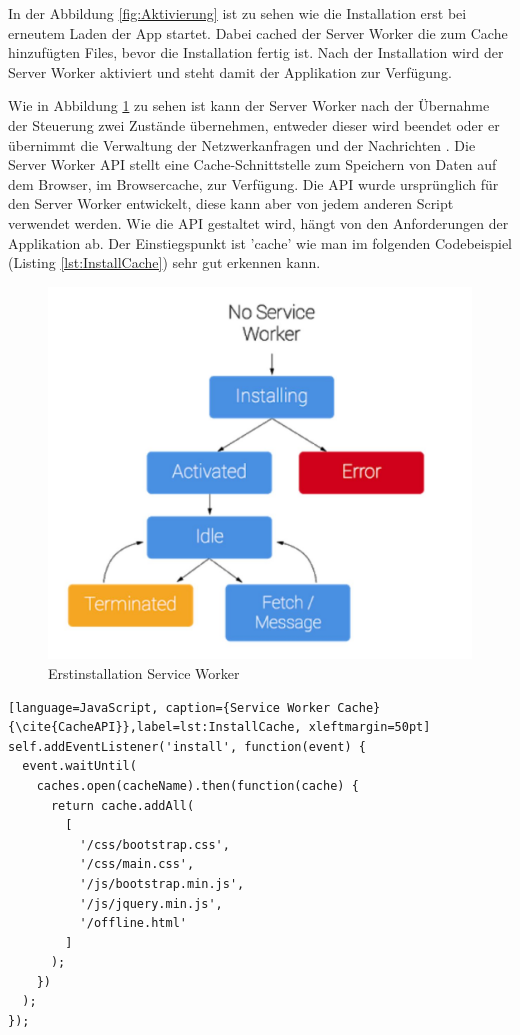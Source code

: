 In der Abbildung \ref{fig:Aktivierung} ist zu sehen wie die Installation erst bei erneutem Laden der App startet. Dabei cached der Server Worker die zum Cache hinzufügten Files, bevor die Installation fertig ist.
Nach der Installation wird der Server Worker aktiviert und steht damit der Applikation zur Verfügung.


Wie in Abbildung \ref{fig:Erstinstallation} zu sehen ist kann der Server Worker nach der Übernahme der Steuerung zwei Zustände übernehmen, entweder dieser wird beendet oder er übernimmt die Verwaltung der Netzwerkanfragen und der Nachrichten \cite{ServiceWorkerRegistration}.
Die Server Worker API stellt eine Cache-Schnittstelle zum Speichern von Daten auf dem Browser, im Browsercache, zur Verfügung. Die API wurde ursprünglich für den Server Worker entwickelt, diese kann aber von jedem anderen Script verwendet werden. 
Wie die API gestaltet wird, hängt von den Anforderungen der Applikation ab.
Der Einstiegspunkt ist 'cache' wie man im folgenden Codebeispiel (Listing \ref{lst:InstallCache}) sehr gut erkennen kann.

\begin{figure}[h]
	\centering
	\includegraphics[width=14cm]{BilderAllgemein/InstallSW}\medskip
	\caption{Erstinstallation Service Worker \cite{ServiceWorkerRegistration}}
	\label{fig:Erstinstallation}
\end{figure}

\newpage
\begin{lstlisting}[language=JavaScript, caption={Service Worker Cache} {\cite{CacheAPI}},label=lst:InstallCache, xleftmargin=50pt]
self.addEventListener('install', function(event) {
  event.waitUntil(
    caches.open(cacheName).then(function(cache) {
      return cache.addAll(
        [
          '/css/bootstrap.css',
          '/css/main.css',
          '/js/bootstrap.min.js',
          '/js/jquery.min.js',
          '/offline.html'
        ]
      );
    })
  );
});
\end{lstlisting}

